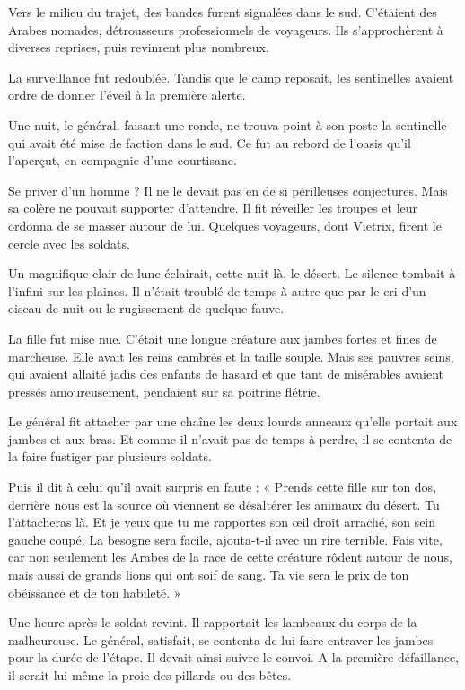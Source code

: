 \documentclass[a4paper, 11pt, oneside, polutonikogreek, french]{article}
\begin{document}
Vers le milieu du trajet, des bandes furent signalées dans le sud. C'étaient des Arabes nomades, détrousseurs professionnels de voyageurs. Ils s'approchèrent à diverses reprises, puis revinrent plus nombreux.

La surveillance fut redoublée. Tandis que le camp reposait, les sentinelles avaient ordre de donner l'éveil à la première alerte.

Une nuit, le général, faisant une ronde, ne trouva point à son poste la sentinelle qui avait été mise de faction dans le sud. Ce fut au rebord de l'oasis qu'il l'aperçut, en compagnie d'une courtisane.

Se priver d'un homme ? Il ne le devait pas en de si périlleuses conjectures. Mais sa colère ne pouvait supporter d'attendre. Il fit réveiller les troupes et leur ordonna de se masser autour de lui. Quelques voyageurs, dont Vietrix, firent le cercle avec les soldats.

Un magnifique clair de lune éclairait, cette nuit-là, le désert. Le silence tombait à l'infini sur les plaines. Il n'était troublé de temps à autre que par le cri d'un oiseau de nuit ou le rugissement de quelque fauve.

La fille fut mise nue. C'était une longue créature aux jambes fortes et fines de marcheuse. Elle avait les reins cambrés et la taille souple. Mais ses pauvres seins, qui avaient allaité jadis des enfants de hasard et que tant de misérables avaient pressés amoureusement, pendaient sur sa poitrine flétrie.

Le général fit attacher par une chaîne les deux lourds anneaux qu'elle portait aux jambes et aux bras. Et comme il n'avait pas de temps à perdre, il se contenta de la faire fustiger par plusieurs soldats.

Puis il dit à celui qu'il avait surpris en faute : « Prends cette fille sur ton dos, derrière nous est la source où viennent se désaltérer les animaux du désert. Tu l'attacheras là. Et je veux que tu me rapportes son œil droit arraché, son sein gauche coupé. La besogne sera facile, ajouta-t-il avec un rire terrible. Fais vite, car non seulement les Arabes de la race de cette créature rôdent autour de nous, mais aussi de grands lions qui ont soif de sang. Ta vie sera le prix de ton obéissance et de ton habileté. »

Une heure après le soldat revint. Il rapportait les lambeaux du corps de la malheureuse. Le général, satisfait, se contenta de lui faire entraver les jambes pour la durée de l'étape. Il devait ainsi suivre le convoi. A la première défaillance, il serait lui-même la proie des pillards ou des bêtes.
\end{document}
